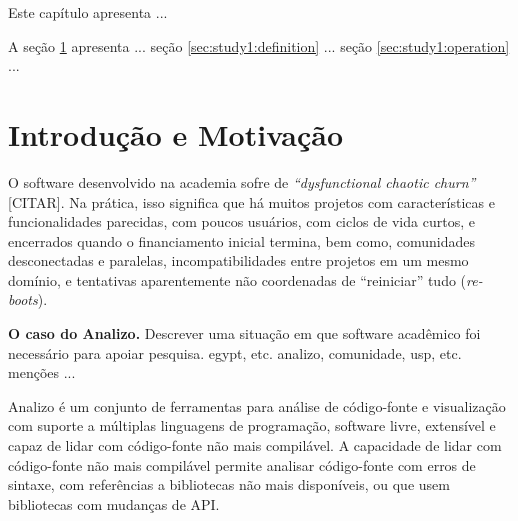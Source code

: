 {Este capítulo apresenta ...}

A seção \ref{sec:study1:intro} apresenta ...
seção \ref{sec:study1:definition} ...
seção \ref{sec:study1:operation} ...


\section{Introdução e Motivação} \label{sec:study1:intro}

O software desenvolvido na academia sofre de {\it ``dysfunctional chaotic churn''} [CITAR].
Na prática, isso significa que há muitos projetos com características e funcionalidades parecidas, 
com poucos usuários, com ciclos de vida curtos, e encerrados quando o financiamento inicial termina,
bem como, comunidades desconectadas e paralelas, incompatibilidades entre projetos em um mesmo domínio, 
e tentativas aparentemente não coordenadas de ``reiniciar'' tudo ({\it re-boots}).

\textbf{O caso do Analizo.}  Descrever uma situação em que software acadêmico foi necessário
para apoiar pesquisa. egypt, etc. analizo, comunidade, usp, etc.
menções ...

Analizo \cite{Terceiro2010Analizo} é um conjunto de ferramentas para análise de código-fonte e
visualização com suporte a múltiplas linguagens de programação, software livre,
extensível e capaz de lidar com código-fonte não mais compilável. A capacidade
de lidar com código-fonte não mais compilável permite analisar código-fonte
com erros de sintaxe, com referências a bibliotecas não mais disponíveis, ou
que usem bibliotecas com mudanças de API.

